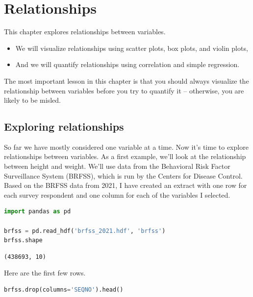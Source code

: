 \chapter{Relationships}\label{relationships}

This chapter explores relationships between variables.

\begin{itemize}
\item
  We will visualize relationships using scatter plots, box plots, and
  violin plots,
\item
  And we will quantify relationships using correlation and simple
  regression.
\end{itemize}

The most important lesson in this chapter is that you should always
visualize the relationship between variables before you try to quantify
it -- otherwise, you are likely to be misled.

\section{Exploring relationships}\label{exploring-relationships}

So far we have mostly considered one variable at a time. Now it's time
to explore relationships between variables. As a first example, we'll
look at the relationship between height and weight. We'll use data from
the Behavioral Risk Factor Surveillance System (BRFSS), which is run by
the Centers for Disease Control. Based on the BRFSS data from 2021, I
have created an extract with one row for each survey respondent and one
column for each of the variables I selected.

\begin{lstlisting}[language=Python,style=source]
import pandas as pd

brfss = pd.read_hdf('brfss_2021.hdf', 'brfss')
brfss.shape
\end{lstlisting}

\begin{lstlisting}[style=output]
(438693, 10)
\end{lstlisting}

Here are the first few rows.

\begin{lstlisting}[language=Python,style=source]
brfss.drop(columns='SEQNO').head()
\end{lstlisting}

